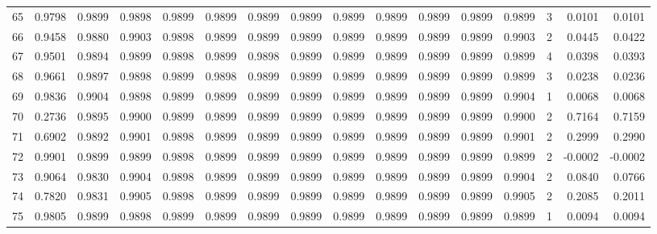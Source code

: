 \begin{tabular}{lrrrrrrrrrrrrrrr}
65  &      0.9798 &  0.9899 &  0.9898 &  0.9899 &  0.9899 &  0.9899 &  0.9899 &  0.9899 &  0.9899 &  0.9899 &   0.9899 &     0.9899 &      3 &                    0.0101 &                     0.0101 \\
66  &      0.9458 &  0.9880 &  0.9903 &  0.9898 &  0.9899 &  0.9899 &  0.9899 &  0.9899 &  0.9899 &  0.9899 &   0.9899 &     0.9903 &      2 &                    0.0445 &                     0.0422 \\
67  &      0.9501 &  0.9894 &  0.9899 &  0.9898 &  0.9899 &  0.9898 &  0.9899 &  0.9899 &  0.9899 &  0.9899 &   0.9899 &     0.9899 &      4 &                    0.0398 &                     0.0393 \\
68  &      0.9661 &  0.9897 &  0.9898 &  0.9899 &  0.9898 &  0.9899 &  0.9899 &  0.9899 &  0.9899 &  0.9899 &   0.9899 &     0.9899 &      3 &                    0.0238 &                     0.0236 \\
69  &      0.9836 &  0.9904 &  0.9898 &  0.9899 &  0.9899 &  0.9899 &  0.9899 &  0.9899 &  0.9899 &  0.9899 &   0.9899 &     0.9904 &      1 &                    0.0068 &                     0.0068 \\
70  &      0.2736 &  0.9895 &  0.9900 &  0.9899 &  0.9899 &  0.9899 &  0.9899 &  0.9899 &  0.9899 &  0.9899 &   0.9899 &     0.9900 &      2 &                    0.7164 &                     0.7159 \\
71  &      0.6902 &  0.9892 &  0.9901 &  0.9898 &  0.9899 &  0.9899 &  0.9899 &  0.9899 &  0.9899 &  0.9899 &   0.9899 &     0.9901 &      2 &                    0.2999 &                     0.2990 \\
72  &      0.9901 &  0.9899 &  0.9899 &  0.9898 &  0.9899 &  0.9899 &  0.9899 &  0.9899 &  0.9899 &  0.9899 &   0.9899 &     0.9899 &      2 &                   -0.0002 &                    -0.0002 \\
73  &      0.9064 &  0.9830 &  0.9904 &  0.9898 &  0.9899 &  0.9899 &  0.9899 &  0.9899 &  0.9899 &  0.9899 &   0.9899 &     0.9904 &      2 &                    0.0840 &                     0.0766 \\
74  &      0.7820 &  0.9831 &  0.9905 &  0.9898 &  0.9899 &  0.9899 &  0.9899 &  0.9899 &  0.9899 &  0.9899 &   0.9899 &     0.9905 &      2 &                    0.2085 &                     0.2011 \\
75  &      0.9805 &  0.9899 &  0.9898 &  0.9899 &  0.9899 &  0.9899 &  0.9899 &  0.9899 &  0.9899 &  0.9899 &   0.9899 &     0.9899 &      1 &                    0.0094 &                     0.0094 \\

\end{tabular}

